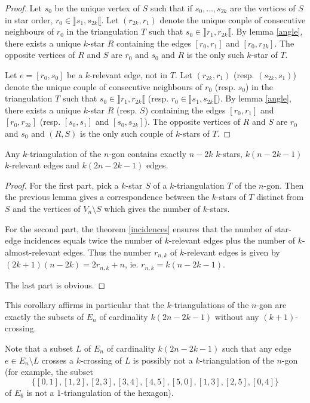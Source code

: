 \documentclass[12pt]{amsart}
\begin{document}
\begin{proof}
Let $s_0$ be the unique vertex of $S$ such that if $s_0,\ldots,s_{2k}$ are the vertices of $S$ in star order, $r_0\in\rrbracket s_1,s_{2k}\llbracket$. Let $(r_{2k},r_{1})$ denote the unique couple of consecutive neighbours of $r_0$ in the triangulation $T$ such that $s_0\in\rrbracket r_1,r_{2k}\llbracket$. By lemma \ref{angle}, there exists a unique $k$-star $R$ containing the edges $[r_0,r_1]$ and $[r_0,r_{2k}]$. The opposite vertices of $R$ and $S$ are $r_0$ and $s_0$ and $R$ is the only such $k$-star of $T$.

Let $e=[r_0,s_0]$ be a $k$-relevant edge, not in $T$. Let $(r_{2k},r_{1})$ (resp. $(s_{2k},s_{1})$) denote the unique couple of consecutive neighbours of $r_0$ (resp. $s_0$) in the triangulation $T$ such that $s_0\in\rrbracket r_1,r_{2k}\llbracket$ (resp. $r_0\in\rrbracket s_1,s_{2k}\llbracket$). By lemma \ref{angle}, there exists a unique $k$-star $R$ (resp. $S$) containing the edges $[r_0,r_1]$ and $[r_0,r_{2k}]$ (resp. $[s_0,s_1]$ and $[s_0,s_{2k}]$). The opposite vertices of $R$ and $S$ are $r_0$ and $s_0$ and $(R,S)$ is the only such couple of $k$-stars of $T$.
\end{proof}

\begin{corollary}\label{starsenumeration}
Any $k$-triangulation of the $n$-gon contains exactly $n-2k$ $k$-stars, $k(n-2k-1)$ $k$-relevant edges and $k(2n-2k-1)$ edges.
\end{corollary}

\begin{proof}
For the first part, pick a $k$-star $S$ of a $k$-triangulation $T$ of the $n$-gon. Then the previous lemma gives a correspondence between the $k$-stars of $T$ distinct from $S$ and the vertices of $V_n\setminus S$ which gives the number of $k$-stars.

For the second part, the theorem \ref{incidences} ensures that the number of star-edge incidences equals twice the number of $k$-relevant edges plus the number of $k$-almost-relevant edges. Thus the number $r_{n,k}$ of $k$-relevant edges is given by $(2k+1)(n-2k)=2r_{n,k}+n$, ie. $r_{n,k}=k(n-2k-1)$.

The last part is obvious.
\end{proof}

\begin{remark}
This corollary affirms in particular that the $k$-triangulations of the $n$-gon are exactly the subsets of $E_n$ of cardinality $k(2n-2k-1)$ without any $(k+1)$-crossing.

Note that a subset $L$ of $E_n$ of cardinality $k(2n-2k-1)$ such that any edge $e\in E_n\setminus L$ crosses a $k$-crossing of $L$ is possibly not a $k$-triangulation of the $n$-gon (for example, the subset $$\{[0,1],[1,2],[2,3],[3,4],[4,5],[5,0],[1,3],[2,5],[0,4]\}$$ of $E_6$ is not a $1$-triangulation of the hexagon).
\end{remark}
\end{document}
